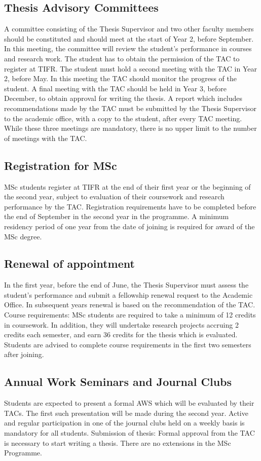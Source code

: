 \documentclass[a4paper,10pt]{article}
\begin{document}
\subsection{Thesis Advisory Committees} A committee consisting of the Thesis
Supervisor and two other faculty members should be constituted and should meet
at the start of Year 2, before September. In this meeting, the committee will
review the student’s performance in courses and research work. The student has
to obtain the permission of the TAC to register at TIFR.  The student must hold
a second meeting with the TAC in Year 2, before May. In this meeting the TAC
should monitor the progress of the student. A final meeting with the TAC should
be held in Year 3, before December, to obtain approval for writing the thesis. A
report which includes recommendations made by the TAC must be submitted by the
Thesis Supervisor to the academic office, with a copy to the student, after
every TAC meeting.  While these three meetings are mandatory, there is no upper
limit to the number of meetings with the TAC.

\subsection{Registration for MSc}
MSc students register at TIFR at the end of their first year or the
beginning of the second year, subject to evaluation of their coursework and research
performance by the TAC. Registration requirements have to be completed before the end of
September in the second year in the programme. A minimum residency period of one year
from the date of joining is required for award of the MSc degree.

\subsection{Renewal of appointment}
In the first year, before the end of June, the Thesis Supervisor
must assess the student’s performance and submit a fellowship renewal request to the
Academic Office. In subsequent years renewal is based on the recommendation of the TAC.
Course requirements: MSc students are required to take a minimum of 12 credits in
coursework. In addition, they will undertake research projects accruing 2 credits each
semester, and earn 36 credits for the thesis which is evaluated. Students are advised to
complete course requirements in the first two semesters after joining.

\subsection{Annual Work Seminars and Journal Clubs}
Students are expected to present a formal
AWS which will be evaluated by their TACs. The first such presentation will be made
during the second year. Active and regular participation in one of the journal clubs held on a
weekly basis is mandatory for all students.
Submission of thesis: Formal approval from the TAC is necessary to start writing a thesis.
There are no extensions in the MSc Programme.
\end{document}
